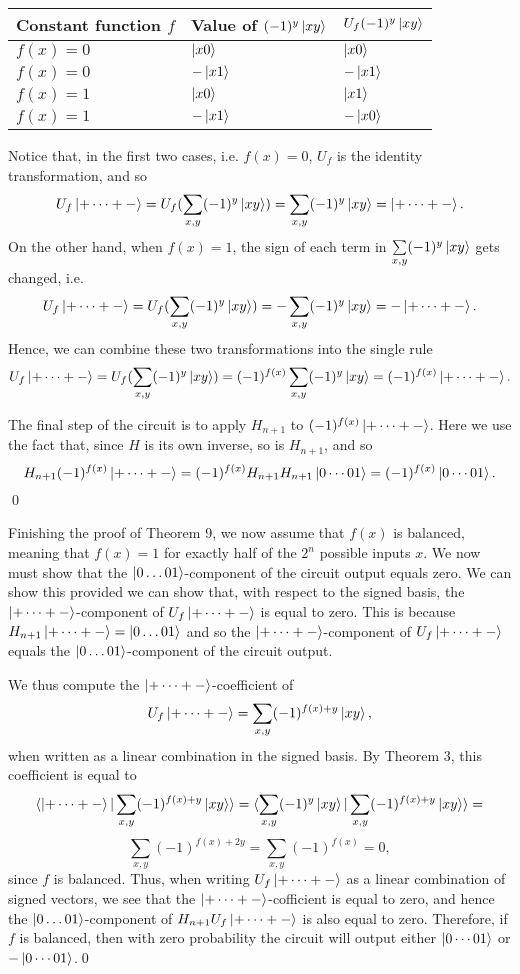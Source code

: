 \documentclass [12pt]{article}
\theoremstyle{definition}
\begin{document}
\begin{tabular}{|l|l|l|}
\hline
\textbf{Constant function $f$} & \textbf{Value of $(-1)^y\ket{xy}$} & $U_f(-1)^y\ket{xy}$\\
\hline
$f(x) = 0$ & $\ket{x0}$ & $\ket{x0}$ \\
\hline
$f(x) = 0$ & $-\ket{x1}$ & $-\ket{x1}$ \\
\hline
$f(x) = 1$ & $\ket{x0}$ & $\ket{x1}$ \\
\hline
$f(x) = 1$ & $-\ket{x1}$ & $-\ket{x0}$ \\
\hline
\end{tabular}

Notice that, in the first two cases, i.e. $f(x)=0$, $U_f$ is the identity transformation, and so 
\[U_f\ket{+\cdots +-} = U_f(\sum_{x,y}(-1)^y\ket{xy}) = \sum_{x,y}(-1)^y\ket{xy} = \ket{+\cdots +-}.\]
On the other hand, when $f(x)=1$, the sign of each term in $\underset{x,y}{\sum}(-1)^y\ket{xy}$ gets changed, i.e.
\[U_f\ket{+\cdots +-} = U_f(\sum_{x,y}(-1)^y\ket{xy}) = -\sum_{x,y}(-1)^y\ket{xy} = -\ket{+\cdots +-}.\]
Hence, we can combine these two transformations into the single rule
\[U_f\ket{+\cdots +-} = U_f(\sum_{x,y}(-1)^y\ket{xy}) = (-1)^{f(x)}\sum_{x,y}(-1)^y\ket{xy}=(-1)^{f(x)} \ket{+\cdots +-}.\]

The final step of the circuit is to apply $H_{n+1}$ to $(-1)^{f(x)} \ket{+\cdots +-}$. Here we use the fact that, since $H$ is its own inverse, so is
$H_{n+1}$, and so 
\[H_{n+1}(-1)^{f(x)} \ket{+\cdots +-} = (-1)^{f(x)}H_{n+1}H_{n+1}\ket{0\cdots 01} = (-1)^{f(x)}\ket{0\cdots 01}.\]
\qed



\newpage
Finishing the proof of Theorem 9, we now assume that $f(x)$ is balanced, meaning that $f(x)=1$ for exactly half of the $2^n$ possible inputs $x$.
 We  now must show that the $\ket{0\ldots 01}$-component of the circuit output equals zero.
We can show this provided we can show that, with respect to the signed basis, the $\ket{+\cdots +-}$-component of $U_f\ket{+\cdots +-}$ is equal to zero.
This is because $H_{n+1}\ket{+\cdots +-} =  \ket{0\ldots 01}$ and so the $\ket{+\cdots +-}$-component of $U_f\ket{+\cdots +-}$ equals the 
$\ket{0\ldots 01}$-component of the circuit output.

We thus compute the $\ket{+\cdots +-}$-coefficient of 
\[U_f\ket{+\cdots +-}= \sum_{x,y}(-1)^{f(x) + y}\ket{xy},\]
when written as a linear combination in the signed basis. By Theorem 3,  this coefficient is equal
to
\[\langle \ket{+\cdots +-} | \sum_{x,y}(-1)^{f(x)+ y}\ket{xy}\rangle = 
\langle \sum_{x,y}(-1)^{y}\ket{xy} | \sum_{x,y}(-1)^{f(x)+y}\ket{xy}\rangle =\]
\[\sum_{x,y}(-1)^{f(x)+2y} = \sum_{x,y}(-1)^{f(x)} = 0,\]
since $f$ is balanced. Thus, when writing $U_f\ket{+\cdots +-}$ as a linear combination of signed vectors, we see that the 
$\ket{+\cdots +-}$-cofficient is equal to zero, and hence the $\ket{0\ldots 01}$-component
of $H_{n+1}U_f\ket{+\cdots +-}$ is also equal to zero. Therefore, if $f$ is balanced, then with zero probability the circuit will output
either  $\ket{0\cdots 01}$ or $-\ket{0\cdots 01}$.\qed
\end{document}
